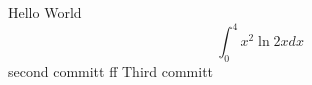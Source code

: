 \documentclass{article}
\begin{document}
Hello World
$$\int_0^4 x^2 \ln{2x}dx$$
second committ  ff
Third committ 
\end{document}
